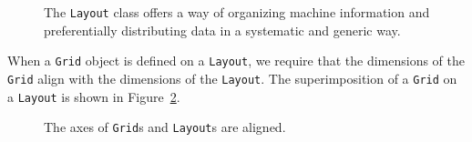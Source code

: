 \begin{figure}
\caption[{Sample {\tt Layouts}}]{The {\tt Layout} class offers a way of organizing 
machine information and preferentially distributing data in a systematic
and generic way.}
\label{fig:layouts}
\end{figure}

When a {\tt Grid} object is defined on a {\tt Layout}, we require that the dimensions 
of the {\tt Grid} align with the dimensions of the {\tt Layout}.  The superimposition
of a {\tt Grid} on a {\tt Layout} is shown in Figure~\ref{fig:gridlayout}.

\begin{figure}
\caption[{{\tt Grid} aligned on a {\tt Layout}}]{The axes of {\tt Grid}s and {\tt Layout}s are aligned.}
\label{fig:gridlayout}
\end{figure}

